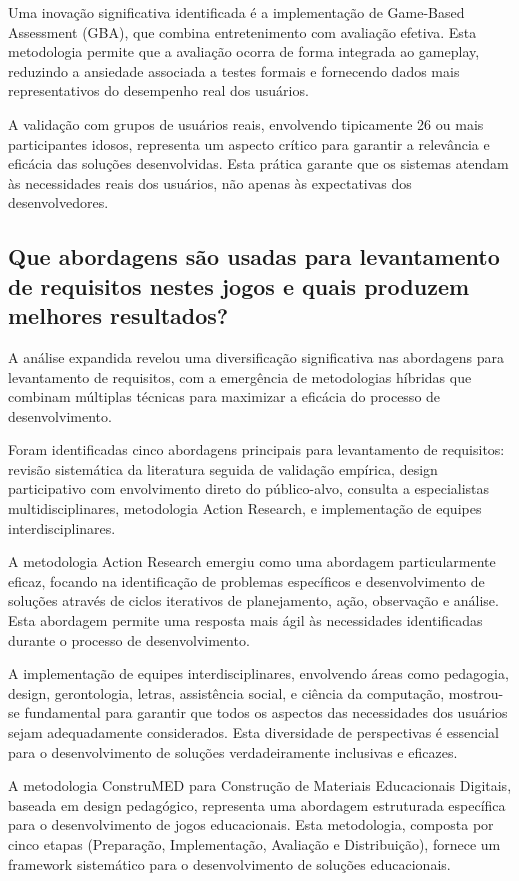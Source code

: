 \begin{table}[H]
Uma inovação significativa identificada é a implementação de Game-Based Assessment (GBA), que combina entretenimento com avaliação efetiva. Esta metodologia permite que a avaliação ocorra de forma integrada ao gameplay, reduzindo a ansiedade associada a testes formais e fornecendo dados mais representativos do desempenho real dos usuários.

A validação com grupos de usuários reais, envolvendo tipicamente 26 ou mais participantes idosos, representa um aspecto crítico para garantir a relevância e eficácia das soluções desenvolvidas. Esta prática garante que os sistemas atendam às necessidades reais dos usuários, não apenas às expectativas dos desenvolvedores.

\subsection{Que abordagens são usadas para levantamento de requisitos nestes jogos e quais produzem melhores resultados?}
\label{subsec:qp3_expandida}

A análise expandida revelou uma diversificação significativa nas abordagens para levantamento de requisitos, com a emergência de metodologias híbridas que combinam múltiplas técnicas para maximizar a eficácia do processo de desenvolvimento.

Foram identificadas cinco abordagens principais para levantamento de requisitos: revisão sistemática da literatura seguida de validação empírica, design participativo com envolvimento direto do público-alvo, consulta a especialistas multidisciplinares, metodologia Action Research, e implementação de equipes interdisciplinares.

A metodologia Action Research emergiu como uma abordagem particularmente eficaz, focando na identificação de problemas específicos e desenvolvimento de soluções através de ciclos iterativos de planejamento, ação, observação e análise. Esta abordagem permite uma resposta mais ágil às necessidades identificadas durante o processo de desenvolvimento.

A implementação de equipes interdisciplinares, envolvendo áreas como pedagogia, design, gerontologia, letras, assistência social, e ciência da computação, mostrou-se fundamental para garantir que todos os aspectos das necessidades dos usuários sejam adequadamente considerados. Esta diversidade de perspectivas é essencial para o desenvolvimento de soluções verdadeiramente inclusivas e eficazes.

A metodologia ConstruMED para Construção de Materiais Educacionais Digitais, baseada em design pedagógico, representa uma abordagem estruturada específica para o desenvolvimento de jogos educacionais. Esta metodologia, composta por cinco etapas (Preparação, Implementação, Avaliação e Distribuição), fornece um framework sistemático para o desenvolvimento de soluções educacionais.


\end{table}
